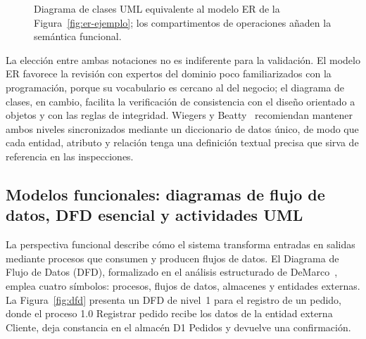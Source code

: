 \documentclass[11pt,a4paper,oneside]{report}
\begin{document}
	\begin{figure}[htbp]
		\centering
		\caption{Diagrama de clases UML equivalente al modelo ER de la Figura~\ref{fig:er-ejemplo}; los compartimentos de operaciones a\~naden la sem\'antica funcional.}
		\label{fig:clases-uml}
	\end{figure}
	
	La elecci\'on entre ambas notaciones no es indiferente para la validaci\'on. El modelo ER favorece la revisi\'on con expertos del dominio poco familiarizados con la programaci\'on, porque su vocabulario es cercano al del negocio; el diagrama de clases, en cambio, facilita la verificaci\'on de consistencia con el dise\~no orientado a objetos y con las reglas de integridad. Wiegers y Beatty~\citep{wiegers_beatty_2013} recomiendan mantener ambos niveles sincronizados mediante un diccionario de datos \'unico, de modo que cada entidad, atributo y relaci\'on tenga una definici\'on textual precisa que sirva de referencia en las inspecciones.
	
	\subsection{Modelos funcionales: diagramas de flujo de datos, DFD esencial y actividades UML}
	
	La perspectiva funcional describe c\'omo el sistema transforma entradas en salidas mediante procesos que consumen y producen flujos de datos. El Diagrama de Flujo de Datos (DFD), formalizado en el an\'alisis estructurado de DeMarco~\citep{demarco_1979}, emplea cuatro s\'imbolos: procesos, flujos de datos, almacenes y entidades externas. La Figura~\ref{fig:dfd} presenta un DFD de nivel~1 para el registro de un pedido, donde el proceso \textsf{1.0 Registrar pedido} recibe los datos de la entidad externa \textsf{Cliente}, deja constancia en el almac\'en \textsf{D1 Pedidos} y devuelve una confirmaci\'on.
	
\end{document}
